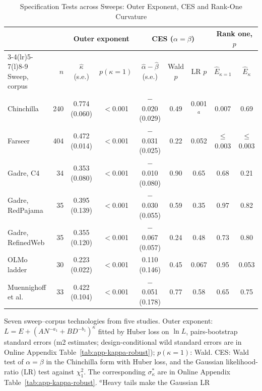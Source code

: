 \begin{table}[tp]
\centering
\caption{Specification Tests across Sweeps: Outer Exponent, CES and Rank-One Curvature}
\label{tab:app-spec-tests}
\footnotesize
\setlength{\tabcolsep}{3pt}
\begin{tabular*}{\textwidth}{@{\extracolsep{\fill}}lrccccccc@{}}
\toprule
 & & \multicolumn{2}{c}{Outer exponent} & \multicolumn{3}{c}{CES ($\alpha=\beta$)} & \multicolumn{2}{c}{Rank one, $p$} \\
\cmidrule(lr){3-4}\cmidrule(lr){5-7}\cmidrule(l){8-9}
Sweep, corpus & $n$ & $\hat\kappa$ (s.e.) & $p(\kappa=1)$ & $\hat\alpha-\hat\beta$ (s.e.) & Wald $p$ & LR $p$ & $\hat E_{\kappa=1}$ & $\hat E_{\kappa}$ \\
\midrule
Chinchilla & 240 & 0.774 (0.060) & $<$0.001 & $-$0.020 (0.029) & 0.49 & 0.001$^a$ & 0.007 & 0.69 \\
Farseer & 404 & 0.472 (0.014) & $<$0.001 & $-$0.031 (0.025) & 0.22 & 0.052 & $\le$0.003 & $\le$0.003 \\
Gadre, C4 & 34 & 0.353 (0.080) & $<$0.001 & $-$0.010 (0.080) & 0.90 & 0.65 & 0.68 & 0.21 \\
Gadre, RedPajama & 35 & 0.395 (0.139) & $<$0.001 & $-$0.030 (0.055) & 0.59 & 0.35 & 0.97 & 0.82 \\
Gadre, RefinedWeb & 35 & 0.355 (0.120) & $<$0.001 & $-$0.067 (0.057) & 0.24 & 0.48 & 0.73 & 0.80 \\
OLMo ladder & 30 & 0.223 (0.022) & $<$0.001 & 0.110 (0.146) & 0.45 & 0.067 & 0.95 & 0.053 \\
Muennighoff et al. & 33 & 0.422 (0.104) & $<$0.001 & $-$0.051 (0.178) & 0.77 & 0.58 & 0.65 & 0.75 \\
\bottomrule
\end{tabular*}
\par\smallskip
\begin{tablenotes}
Seven sweep--corpus technologies from five studies. Outer exponent: $L=E+(AN^{-a_1}+BD^{-b_1})^\kappa$ fitted by Huber
loss on $\ln L$, pairs-bootstrap standard errors (m2 estimates; design-conditional wild standard errors are in Online
Appendix Table~\ref{tab:app-kappa-robust}); $p(\kappa=1)$: Wald. CES: Wald test of $\alpha=\beta$ in the Chinchilla
form with Huber loss, and the Gaussian likelihood-ratio (LR) test against $\chi^2_1$. The corresponding $\sigma^*_\kappa$ are in Online Appendix Table~\ref{tab:app-kappa-robust}. $^a$Heavy tails make the Gaussian LR

\end{tablenotes}
\end{table}

